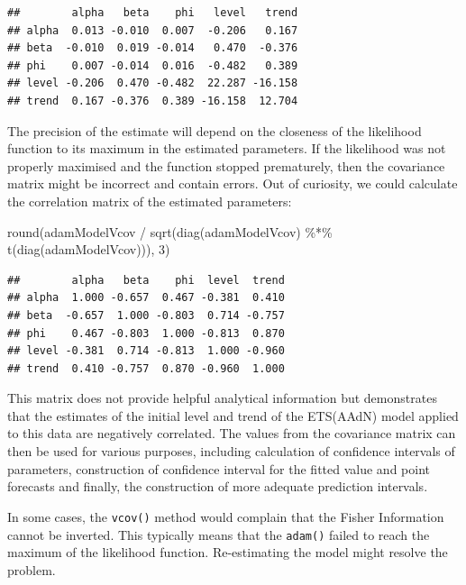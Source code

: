 \documentclass[
]{book}
\newenvironment{Shaded}{\begin{snugshade}}{\end{snugshade}}
\newcommand{\DecValTok}[1]{\textcolor[rgb]{0.00,0.00,0.81}{#1}}
\newcommand{\FunctionTok}[1]{\textcolor[rgb]{0.00,0.00,0.00}{#1}}
\newcommand{\NormalTok}[1]{#1}
\newcommand{\SpecialCharTok}[1]{\textcolor[rgb]{0.00,0.00,0.00}{#1}}
\theoremstyle{definition}
\theoremstyle{definition}
\theoremstyle{definition}
\theoremstyle{definition}
\theoremstyle{remark}
\begin{document}
\begin{verbatim}
##        alpha   beta    phi   level   trend
## alpha  0.013 -0.010  0.007  -0.206   0.167
## beta  -0.010  0.019 -0.014   0.470  -0.376
## phi    0.007 -0.014  0.016  -0.482   0.389
## level -0.206  0.470 -0.482  22.287 -16.158
## trend  0.167 -0.376  0.389 -16.158  12.704
\end{verbatim}

The precision of the estimate will depend on the closeness of the likelihood function to its maximum in the estimated parameters. If the likelihood was not properly maximised and the function stopped prematurely, then the covariance matrix might be incorrect and contain errors. Out of curiosity, we could calculate the correlation matrix of the estimated parameters:

\begin{Shaded}
\begin{Highlighting}[]
\FunctionTok{round}\NormalTok{(adamModelVcov }\SpecialCharTok{/}
        \FunctionTok{sqrt}\NormalTok{(}\FunctionTok{diag}\NormalTok{(adamModelVcov) }\SpecialCharTok{\%*\%}
               \FunctionTok{t}\NormalTok{(}\FunctionTok{diag}\NormalTok{(adamModelVcov))), }\DecValTok{3}\NormalTok{)}
\end{Highlighting}
\end{Shaded}

\begin{verbatim}
##        alpha   beta    phi  level  trend
## alpha  1.000 -0.657  0.467 -0.381  0.410
## beta  -0.657  1.000 -0.803  0.714 -0.757
## phi    0.467 -0.803  1.000 -0.813  0.870
## level -0.381  0.714 -0.813  1.000 -0.960
## trend  0.410 -0.757  0.870 -0.960  1.000
\end{verbatim}

This matrix does not provide helpful analytical information but demonstrates that the estimates of the initial level and trend of the ETS(AAdN) model applied to this data are negatively correlated. The values from the covariance matrix can then be used for various purposes, including calculation of confidence intervals of parameters, construction of confidence interval for the fitted value and point forecasts and finally, the construction of more adequate prediction intervals.

In some cases, the \texttt{vcov()} method would complain that the Fisher Information cannot be inverted. This typically means that the \texttt{adam()} failed to reach the maximum of the likelihood function. Re-estimating the model might resolve the problem.
\end{document}
